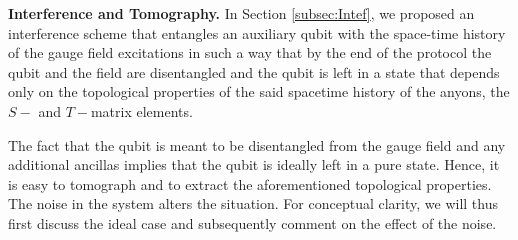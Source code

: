 \documentclass[two column]{article}
\begin{document}
%









\textbf{Interference and Tomography.}
In Section \ref{subsec:Intef}, we proposed an interference scheme that entangles an auxiliary qubit with the space-time history of the gauge field excitations in such a way that by the end of the protocol the qubit and the field are disentangled and the qubit is left in a state that depends only on the topological properties of the said spacetime history of the anyons, the $S-$ and $T-$matrix elements.

The fact that the qubit is meant to be disentangled from the gauge field and any additional ancillas implies that the qubit is ideally left in a pure state. Hence, it is easy to tomograph and to extract the aforementioned topological properties. The noise in the system alters the situation. For conceptual clarity, we will thus first discuss the ideal case and subsequently comment on the effect of the noise.
\end{document}

